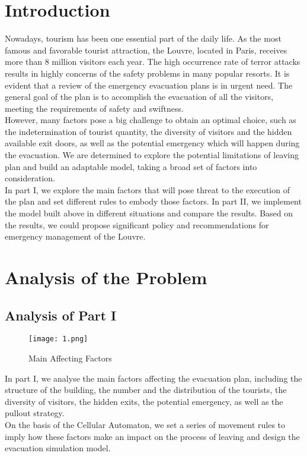 \documentclass{mcmthesis}
\begin{document}
\section{Introduction}
Nowadays, tourism has been one  essential part of the daily life. As the most famous and favorable tourist attraction, the Louvre, located in Paris,  receives more than 8 million visitors each year. The high occurrence rate of terror attacks results in highly concerns of the safety problems in many popular resorts. It is evident that a review of the  emergency evacuation plans  is in urgent need. The general goal of the plan is to accomplish the evacuation of all the visitors, meeting the requirements of safety and swiftness.\\
\indent However, many factors pose a big challenge to obtain an optimal choice, such as the indetermination of tourist quantity, the diversity of visitors and the hidden available exit doors, as well as the potential emergency which will happen during the evacuation. We are determined to explore the potential limitations of leaving plan and  build an adaptable model, taking a broad set of factors into consideration.\\
\indent In part I, we explore the main factors that will pose threat to the execution of the plan and set different rules to embody those factors. In part II, we implement the model built above in different situations and compare the results. Based on the results, we could propose significant policy and recommendations for emergency management of the Louvre.
\section{Analysis of the Problem}
\subsection{Analysis of Part I}
\begin{figure}[htbp]
	\centering
	\caption{Main Affecting Factors}
	\texttt{[image: 1.png]}
\end{figure}
\noindent In part I,  we analyse the main factors affecting the evacuation plan, including the structure of the building, the number and the distribution of the tourists, the diversity of visitors, the hidden exits, the potential emergency, as well as the pullout strategy. \\
\indent On the basis of the Cellular Automaton, we set a series of movement rules to imply how these factors  make an impact on the process of leaving  and design the evacuation simulation model.
\end{document}
